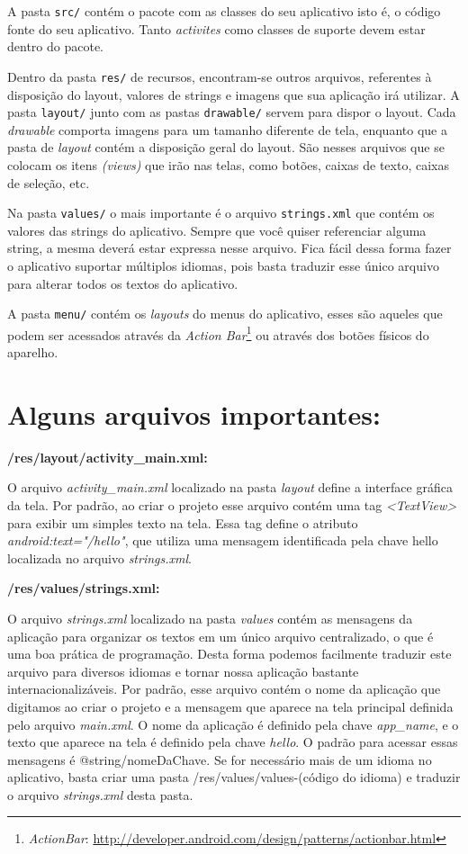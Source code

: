 \documentclass[a4paper,12pt,brazil,oneside]{book}
\begin{document}
 A pasta \texttt{src/} contém o pacote com as classes do seu aplicativo isto é, o código fonte do seu aplicativo. Tanto \emph{activites} como classes de suporte devem estar dentro do pacote.

Dentro da pasta \texttt{res/} de recursos, encontram-se outros arquivos, referentes à disposição do layout, valores de strings e imagens que sua aplicação irá utilizar. A pasta \texttt{layout/} junto com as pastas \texttt{drawable/} servem para dispor o layout. Cada \textit{drawable} comporta imagens para um tamanho diferente de tela, enquanto que a pasta de \textit{layout} contém a disposição geral do layout. São nesses arquivos que se colocam os itens \emph{(views)} que irão nas telas, como botões, caixas de texto, caixas de seleção, etc.

Na pasta \texttt{values/} o mais importante é o arquivo \texttt{strings.xml} que contém os valores das strings do aplicativo. Sempre que você quiser referenciar alguma string, a mesma deverá estar expressa nesse arquivo. Fica fácil dessa forma fazer o aplicativo suportar múltiplos idiomas, pois basta traduzir esse único arquivo para alterar todos os textos do aplicativo.

A pasta \texttt{menu/} contém os \emph{layouts} do menus do aplicativo, esses são aqueles que podem ser acessados através da \emph{Action Bar}\footnote{\emph{ActionBar}: \href{http://developer.android.com/design/patterns/actionbar.html}{http://developer.android.com/design/patterns/actionbar.html}} ou através dos botões físicos do aparelho.

\section{Alguns arquivos importantes:}

\textbf{/res/layout/activity\_main.xml:}

O arquivo \emph{activity\_main.xml} localizado na pasta \emph{layout} define a interface gráfica da tela. Por padrão, ao criar o projeto esse arquivo contém uma tag \emph{<TextView>} para exibir um simples texto na tela. Essa tag define o atributo \emph{android:text="\@string/hello"}, que utiliza uma mensagem identificada pela chave hello localizada no arquivo \emph{strings.xml}.

\textbf{/res/values/strings.xml:}

O arquivo \emph{strings.xml} localizado na pasta \emph{values} contém as mensagens da aplicação para organizar os textos em um único arquivo centralizado, o que é uma boa prática de programação. Desta forma podemos facilmente traduzir este arquivo para diversos idiomas e tornar nossa aplicação bastante internacionalizáveis.
Por padrão, esse arquivo contém o nome da aplicação que digitamos ao criar o projeto e a mensagem que aparece na tela principal definida pelo arquivo \emph{main.xml}.
O nome da aplicação é definido pela chave \emph{app\_name}, e o texto que aparece na tela é definido pela chave \emph{hello}.  O padrão para acessar essas mensagens é @string/nomeDaChave.
Se for necessário mais de um idioma no aplicativo, basta criar uma pasta /res/values/values-(código do idioma) e traduzir o arquivo \emph{strings.xml} desta pasta.
\end{document}
